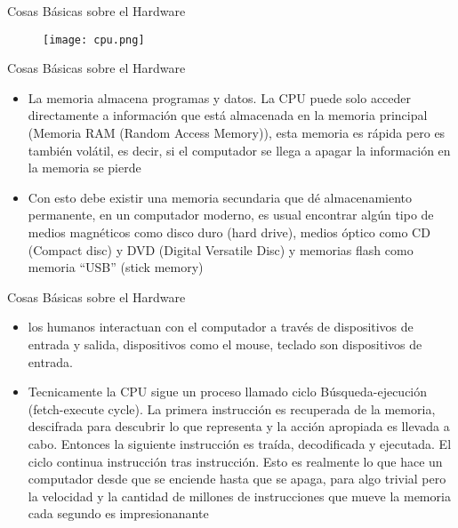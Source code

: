 \documentclass[ignorenonframetext,]{beamer}
\begin{document}
\begin{frame}{Cosas Básicas sobre el Hardware}

\begin{center}
\begin{figure}
\texttt{[image: cpu.png]}
\end{figure}
\end{center}

\end{frame}

\begin{frame}{Cosas Básicas sobre el Hardware}

\begin{itemize}
\item
  La memoria almacena programas y datos. La CPU puede solo acceder
  directamente a información que está almacenada en la memoria principal
  (Memoria RAM (Random Access Memory)), esta memoria es rápida pero es
  también volátil, es decir, si el computador se llega a apagar la
  información en la memoria se pierde
\item
  Con esto debe existir una memoria secundaria que dé almacenamiento
  permanente, en un computador moderno, es usual encontrar algún tipo de
  medios magnéticos como disco duro (hard drive), medios óptico como CD
  (Compact disc) y DVD (Digital Versatile Disc) y memorias flash como
  memoria ``USB'' (stick memory)
\end{itemize}

\end{frame}

\begin{frame}{Cosas Básicas sobre el Hardware}

\begin{itemize}
\item
  los humanos interactuan con el computador a través de dispositivos de
  entrada y salida, dispositivos como el mouse, teclado son dispositivos
  de entrada.
\item
  Tecnicamente la CPU sigue un proceso llamado ciclo Búsqueda-ejecución
  (fetch-execute cycle). La primera instrucción es recuperada de la
  memoria, descifrada para descubrir lo que representa y la acción
  apropiada es llevada a cabo. Entonces la siguiente instrucción es
  traída, decodificada y ejecutada. El ciclo continua instrucción tras
  instrucción. Esto es realmente lo que hace un computador desde que se
  enciende hasta que se apaga, para algo trivial pero la velocidad y la
  cantidad de millones de instrucciones que mueve la memoria cada
  segundo es impresionanante
\end{itemize}

\end{frame}
\end{document}
